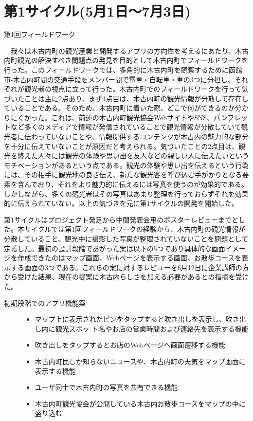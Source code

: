 \section{第1サイクル(5月1日〜7月3日)}

\begin{description}
\item[第1回フィールドワーク]\mbox{}
\end{description}
　我々は木古内町の観光産業と開発するアプリの方向性を考えるにあたり、木古内町観光の解決すべき問題点の発見を目的として木古内町でフィールドワークを行った。このフィールドワークでは、多角的に木古内町を観察するために函館市-木古内町間の交通手段をメンバー間で電車・自転車・車の3つに分担し、それぞれが観光者の視点に立って行った。木古内町でのフィールドワークを行って気づいたことは主に2点あり、まず1点目は、木古内町の観光情報が分散して存在していることである。そのため、木古内町に着いた際、どこで何ができるのか分かりにくかった。これは、前述の木古内町観光協会WebサイトやSNS、パンフレットなど多くのメディアで情報が発信されていることで観光情報が分散していて観光者に伝わっていないことや、情報提供するコンテンツが木古内の魅力的な部分を十分に伝えていないことが原因だと考えられる。気づいたことの2点目は、観光を終えた人々には観光の体験や思い出を友人などの親しい人に伝えたいというモチベーションがあるという点である。観光の体験や思い出を伝えるという行為には、その相手に観光地の良さ伝え、新たな観光客を呼び込む手がかりとなる要素を含んでおり、それをより魅力的に伝えるには写真を使うのが効果的である。しかしながら、多くの観光者はその写真はあまり整理を行っておらずそれを効果的に伝えられていない。以上の気づきを元に第1サイクルの開発を開始した。

第1サイクルはプロジェクト発足から中間発表会用のポスターレビューまでとした。本サイクルでは第1回フィールドワークの経験から、木古内町の観光情報が分散していること、観光中に撮影した写真が整理されていないことを問題として定義した。最初の設計段階であがった案は以下の5つであり具体的な画面イメージを作成できたのはマップ画面、Webページを表示する画面、お散歩コースを表示する画面の3つである。これらの案に対するレビューを6月12日に企業講師の方から受けた結果、現在の提案に木古内らしさを加える必要があるとの指摘を受けた。
\begin{description}
\item[初期段階でのアプリ機能案]\mbox{}
\begin{itemize}
 \item マップ上に表示されたピンをタップすると吹き出しを表示し、吹き出し内に観光スポッ ト名やお店の営業時間および連絡先を表示する機能
  \item 吹き出しをタップするとお店のWebページへ画面遷移する機能
 \item 木古内町民しか知らないニュースや、木古内町の天気をマップ画面に表示する機能
 \item ユーザ同士で木古内町の写真を共有できる機能
 \item 木古内町観光協会が公開している木古内お散歩コースをマップの中に盛り込む
\end{itemize}
\end{description}

